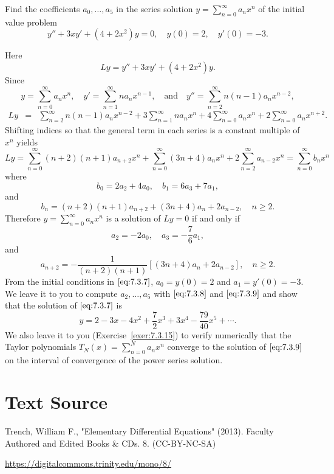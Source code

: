 \documentclass{ximera}
\begin{document}
\begin{example}\label{example:7.3.3}
Find the coefficients $a_0, \dots, a_5$ in the series
solution $y=\sum^\infty_{n=0}
a_nx^n$   of the initial value problem
\begin{equation} \label{eq:7.3.7}
y''+3xy'+(4+2x^2)y=0,\quad y(0)=2,\quad y'(0)=-3.
\end{equation}
\begin{explanation}
Here
$$
Ly=y''+3xy'+(4+2x^2)y.
$$
Since
$$
y=\sum^\infty_{n=0} a_nx^n,\quad y'=\sum^\infty_{n=1} n
a_nx^{n-1},\quad\mbox{and}\quad
y''=\sum^\infty_{n=2}n(n-1)a_nx^{n-2},
$$
\begin{eqnarray*}
Ly&=&\sum^\infty_{n=2}n(n-1)a_nx^{n-2}
+3\sum^\infty_{n=1}na_nx^n+4\sum^\infty_{n=0}a_nx^n+2\sum^\infty_{n=0}
a_nx^{n+2}.
\end{eqnarray*}
Shifting indices so  that the general term in each
series is a constant multiple of $x^n$ yields
$$
Ly=\sum^\infty_{n=0}(n+2)(n+1)a_{n+2}x^n+\sum^\infty_{n=0}(3n+4)a_nx^n
+2\sum^\infty_{n=2}a_{n-2}x^n=\sum_{n=0}^\infty b_nx^n
$$
where
$$
b_0=2a_2+4a_0,\quad b_1=6a_3+7a_1,
$$
and
$$
b_n=(n+2)(n+1)a_{n+2}+(3n+4)a_n+2a_{n-2},\quad n\geq2.
$$
Therefore $y=\sum^\infty_{n=0}a_nx^n$ is a solution of $Ly=0$
if and only if
\begin{equation} \label{eq:7.3.8}
a_2=-2a_0,\quad a_3=-\frac{7}{6}a_1,
\end{equation}
and
\begin{equation} \label{eq:7.3.9}
a_{n+2}=-\frac{1}{(n+2)(n+1)}\left[(3n+4)a_n+2a_{n-2}\right],\quad n\geq2.
\end{equation}
From the initial conditions in $\eqref{eq:7.3.7}$, $a_0=y(0)=2$ and
$a_1=y'(0)=-3$. We leave it to you to compute $a_2, \dots, a_5$ with $\eqref{eq:7.3.8}$ and $\eqref{eq:7.3.9}$ and show that the solution of
$\eqref{eq:7.3.7}$ is
$$
y=2-3x-4x^2+\frac{7}{2}x^3+3x^4-\frac{79}{40}x^5+\cdots.
$$
We also leave it to you 
(Exercise~\ref{exer:7.3.15}) 
to verify numerically
that the Taylor polynomials $T_N(x)=\sum_{n=0}^Na_nx^n$ converge to the solution of $\eqref{eq:7.3.9}$ on the interval of convergence of the power series solution.
\end{explanation}
\end{example}

\section*{Text Source}
Trench, William F., "Elementary Differential Equations" (2013). Faculty Authored and Edited Books \& CDs. 8. (CC-BY-NC-SA)

\href{https://digitalcommons.trinity.edu/mono/8/}{https://digitalcommons.trinity.edu/mono/8/}
\end{document}
